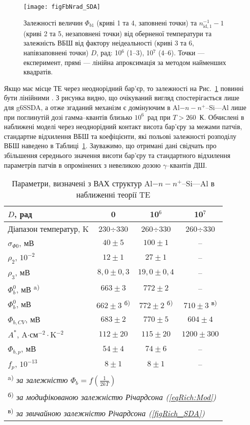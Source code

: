 \begin{figure}
\center
\texttt{[image: figFbNrad\_SDA]}
\caption{\label{figFbNrad_SDA}
Залежності величин $\Phi_{b1}$ (криві 1 та 4, заповнені точки) та
$n_{\mathrm{id},1}^{-1}-1$ (криві 2 та 5, незаповнені точки) від оберненої температури
та залежність ВБШ від фактору неідеальності (криві 3 та 6, напівзаповнені точки)
$D$, рад: 10$^6$ (1--3), 10$^7$ (4--6).
Точки --- експеримент,
прямі --- лінійна апроксимація за методом найменших квадратів.
}%
\end{figure}

Якщо має місце ТЕ через неоднорідний бар'єр, то залежності на Рис.~\ref{figFbNrad_SDA} повинні бути лінійними \cite{Werner,Tung:PhysRev,Schmitsdorf}.
З рисунка видно, що очікуваний вигляд спостерігається лише для g6SSDA,
а отже згаданий механізм є домінуючим в Al$-n-n^+$--Si---Al лише при поглинутій дозі гамма--квантів близько $10^6$~рад при $T>260$~К.
Обчислені в наближені моделі через неоднорідний контакт висота бар'єру за межами патчів,
стандартне відхилення ВБШ та коефіцієнти, які польові залежності розподілу ВБШ наведено в Таблиці~\ref{tabSDAParRad}.
Зауважимо, що отримані дані свідчать про збільшення середнього значення висоти бар'єру та
стандартного відхилення параметрів патчів в опромінених з невеликою дозою $\gamma$--квантів ДШ.

\begin{table}
\caption{Параметри, визначені з ВАХ структур Al$-n-n^+$--Si---Al в наближенні теорії TE}
\label{tabSDAParRad}
\centering
\begin{tabular}{|l|c|c|c|}
\hline
$D$, рад & 0&10$^6$&10$^7$\\ \hline
Діапазон температур, K&230$\div$330&260$\div$330&260$\div$330\\ \hline
$\sigma_{\Phi0}$, мВ&$40\pm5$&$100\pm1$&--\\ \hline
$\rho_2$, $10^{-2}$&$12\pm1$&$27\pm1$&--\\ \hline
$\rho_3$, мВ&$8,0\pm0,3$&$19,0\pm0,4$&--\\ \hline
$\Phi_b^0$, мВ \textsuperscript{ a)}&$663\pm3$&$772\pm2$&--\\ \hline
$\Phi_b^0$, мВ &$662\pm3$ \textsuperscript{ б)}&$772\pm2$ \textsuperscript{ б)}&$710\pm3$ \textsuperscript{ в)}\\ \hline
$\Phi_{b,CV}$, мВ &$683\pm2$&$770\pm5$&$604\pm4$\\ \hline
$A^*$, A$\cdot$см$^{-2}\cdot$K$^{-2}$&$112\pm20$&$115\pm20$&$1200\pm300$\\
\hline
$\Phi_{b,p}$, мВ&$54\pm4$&$74\pm6$&--\\ \hline
$f_p$, $10^{-13}$&$8\pm1$&$8\pm1$&--\\ \hline
\multicolumn{4}{l}{\textsuperscript{ a)} \emph{за залежністю $\Phi_b=f(\frac{1}{2kT})$}} \\
\multicolumn{4}{l}{\textsuperscript{ б)} \emph{за модифікованою залежністю Річардсона (\ref{eqRich:Mod}) }} \\
\multicolumn{4}{l}{\textsuperscript{ в)} \emph{за звичайною залежністю Річардсона (\ref{figRich_SDA})}} \\
\end{tabular}
\end{table}


